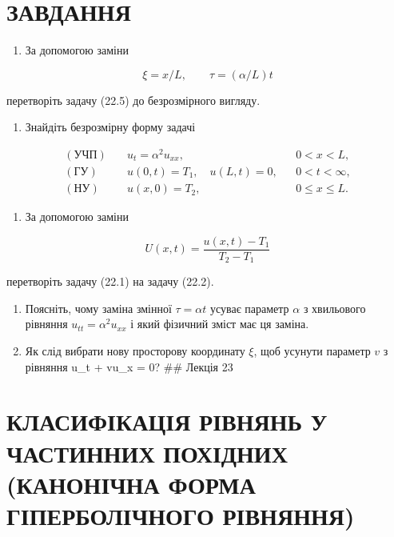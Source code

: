 \documentclass[
  ukrainian,
]{article}
\providecommand{\tightlist}{%
  \setlength{\itemsep}{0pt}\setlength{\parskip}{0pt}}
\begin{document}
\section{ЗАВДАННЯ}\label{ux437ux430ux432ux434ux430ux43dux43dux44f}

\begin{enumerate}
\def\labelenumi{\arabic{enumi}.}
\tightlist
\item
  За допомогою заміни
\end{enumerate}

\[
\xi = x/L, \qquad \tau = (\alpha/L)t
\]

перетворіть задачу (22.5) до безрозмірного вигляду.

\begin{enumerate}
\def\labelenumi{\arabic{enumi}.}
\setcounter{enumi}{1}
\tightlist
\item
  Знайдіть безрозмірну форму задачі
\end{enumerate}

\[
\begin{aligned}
(\text{УЧП})\quad & u_t = \alpha^2 u_{xx}, && 0 < x < L, \\
(\text{ГУ})\quad & u(0,t) = T_1,\quad u(L,t) = 0, && 0 < t < \infty, \\
(\text{НУ})\quad & u(x,0) = T_2, && 0 \le x \le L.
\end{aligned}
\]

\begin{enumerate}
\def\labelenumi{\arabic{enumi}.}
\setcounter{enumi}{2}
\tightlist
\item
  За допомогою заміни
\end{enumerate}

\[
U(x,t) = \frac{u(x,t) - T_1}{T_2 - T_1}
\]

перетворіть задачу (22.1) на задачу (22.2).

\begin{enumerate}
\def\labelenumi{\arabic{enumi}.}
\setcounter{enumi}{3}
\item
  Поясніть, чому заміна змінної \(\tau = \alpha t\) усуває параметр
  \(\alpha\) з хвильового рівняння \(u_{tt} = \alpha^2 u_{xx}\) і який
  фізичний зміст має ця заміна.
\item
  Як слід вибрати нову просторову координату \(\xi\), щоб усунути
  параметр \(v\) з рівняння u\_t + vu\_x = 0? \#\# Лекція 23
\end{enumerate}

\section{КЛАСИФІКАЦІЯ РІВНЯНЬ У ЧАСТИННИХ ПОХІДНИХ (КАНОНІЧНА ФОРМА
ГІПЕРБОЛІЧНОГО
РІВНЯННЯ)}\label{ux43aux43bux430ux441ux438ux444ux456ux43aux430ux446ux456ux44f-ux440ux456ux432ux43dux44fux43dux44c-ux443-ux447ux430ux441ux442ux438ux43dux43dux438ux445-ux43fux43eux445ux456ux434ux43dux438ux445-ux43aux430ux43dux43eux43dux456ux447ux43dux430-ux444ux43eux440ux43cux430-ux433ux456ux43fux435ux440ux431ux43eux43bux456ux447ux43dux43eux433ux43e-ux440ux456ux432ux43dux44fux43dux43dux44f}
\end{document}

